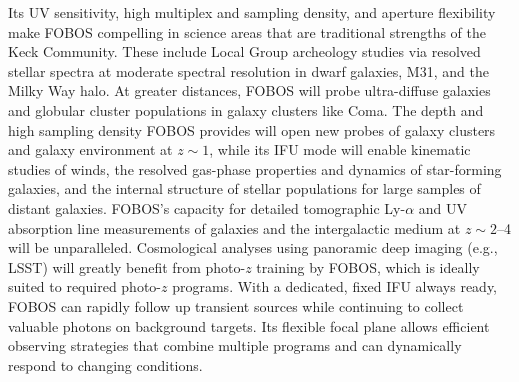 Its UV sensitivity, high multiplex and sampling density, and aperture flexibility make FOBOS compelling in science
areas that are traditional strengths of the Keck Community.  These include Local Group archeology studies via resolved
stellar spectra at moderate spectral resolution in dwarf galaxies, M31, and the Milky Way halo.  At greater distances,
FOBOS will probe ultra-diffuse galaxies and globular cluster populations in galaxy clusters like Coma.  The depth and
high sampling density FOBOS provides will open new probes of galaxy clusters and galaxy environment at $z \sim 1$,
while its IFU mode will enable kinematic studies of winds, the resolved gas-phase properties and dynamics of
star-forming galaxies, and the internal structure of stellar populations for large samples of distant galaxies.
FOBOS's capacity for detailed tomographic Ly-$\alpha$ and UV absorption line measurements of galaxies and the
intergalactic medium at $z \sim 2$--4 will be unparalleled.  Cosmological analyses using panoramic deep imaging (e.g.,
LSST) will greatly benefit from photo-$z$ training by FOBOS, which is ideally suited to required photo-$z$ programs.
With a dedicated, fixed IFU always ready, FOBOS can rapidly follow up transient sources while continuing to collect
valuable photons on background targets.  Its flexible focal plane allows efficient observing strategies that combine
multiple programs and can dynamically respond to changing conditions.




